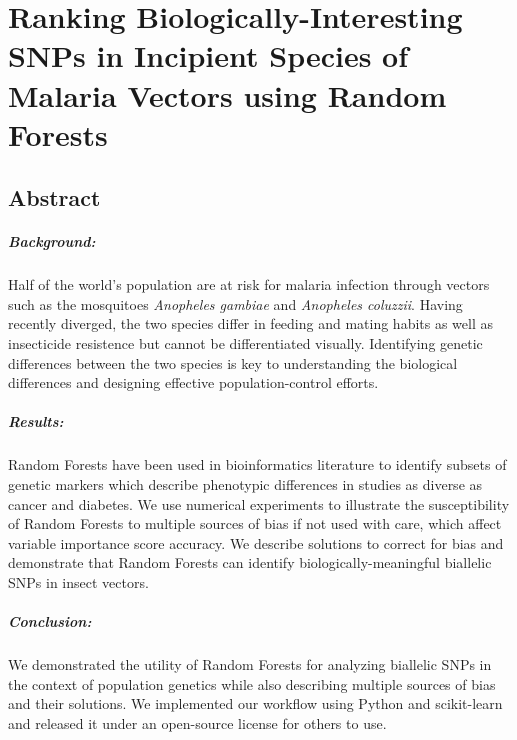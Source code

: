 \chapter{Ranking Biologically-Interesting SNPs in Incipient Species of Malaria Vectors using Random Forests}

\section{Abstract}
  \paragraph*{Background:}
  Half of the world's population are at risk for malaria infection through vectors such as the mosquitoes \emph{Anopheles gambiae} and \emph{Anopheles coluzzii}.  Having recently diverged, the two species differ in feeding and mating habits as well as insecticide resistence but cannot be differentiated visually. Identifying genetic differences between the two species is key to understanding the biological differences and designing effective population-control efforts.
  
  \paragraph*{Results:}
  Random Forests have been used in bioinformatics literature to identify subsets of genetic markers which describe phenotypic differences in studies as diverse as cancer and diabetes. 
  We use numerical experiments to illustrate the susceptibility of Random Forests to multiple sources of bias if not used with care, which affect variable importance score accuracy.
  We describe solutions to correct for bias and demonstrate that Random Forests can identify biologically-meaningful biallelic SNPs in insect vectors.
  
  \paragraph*{Conclusion:}
  We demonstrated the utility of Random Forests for analyzing biallelic SNPs in the context of population genetics while also describing multiple sources of bias and their solutions.  We implemented our workflow using Python and scikit-learn and released it under an open-source license for others to use.


